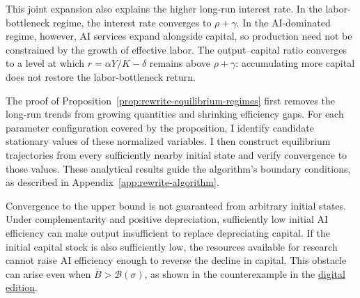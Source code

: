 This joint expansion also explains the higher long-run interest rate.
In the labor-bottleneck regime, the interest rate converges to
$\rho+\gamma$. In the AI-dominated regime, however, AI
services expand alongside capital, so production need not be constrained
by the growth of effective labor. The output--capital ratio converges to
a level at which $r=\alpha Y/K-\delta$ remains above $\rho+\gamma$:
accumulating more capital does not restore the labor-bottleneck return.

The proof of Proposition~\ref{prop:rewrite-equilibrium-regimes} first removes the long-run trends from growing quantities and shrinking efficiency gaps. For each parameter configuration covered by the proposition, I identify candidate stationary values of these normalized variables. I then construct equilibrium trajectories from every sufficiently nearby initial state and verify convergence to those values. These analytical results guide the algorithm's boundary conditions, as described in
Appendix~\ref{app:rewrite-algorithm}.%


Convergence to the upper bound is not guaranteed from arbitrary initial
states. Under complementarity and positive depreciation, sufficiently
low initial AI efficiency can make output insufficient to replace
depreciating capital. If the initial capital stock is also sufficiently
low, the resources available for research cannot raise AI efficiency
enough to reverse the decline in capital. This obstacle can arise even
when $\overline B>\mathcal B(\sigma)$, as shown in the counterexample
in the
\href{https://oliverpardo1979.github.io/ai-growth-and-labor/#rem:rewrite-efficiency-nonattainment}
{digital edition}.

